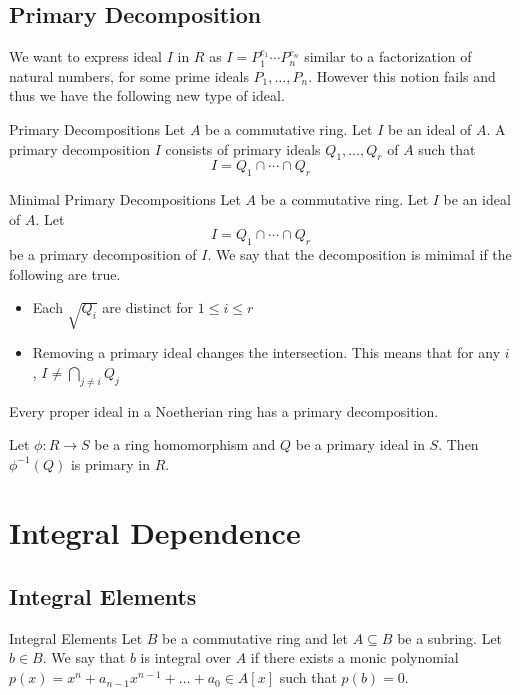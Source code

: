 \documentclass[a4paper]{article}
\begin{document}
\subsection{Primary Decomposition}
We want to express ideal $I$ in $R$ as $I=P_1^{e_1}\cdots P_n^{e_n}$ similar to a factorization of natural numbers, for some prime ideals $P_1,\dots,P_n$. However this notion fails and thus we have the following new type of ideal. 

\begin{defn}{Primary Decompositions}{} Let $A$ be a commutative ring. Let $I$ be an ideal of $A$. A primary decomposition $I$ consists of primary ideals $Q_1,\dots,Q_r$ of $A$ such that $$I=Q_1\cap\cdots\cap Q_r$$
\end{defn}

\begin{defn}{Minimal Primary Decompositions}{} Let $A$ be a commutative ring. Let $I$ be an ideal of $A$. Let $$I=Q_1\cap\cdots\cap Q_r$$ be a primary decomposition of $I$. We say that the decomposition is minimal if the following are true. 
\begin{itemize}
\item Each $\sqrt{Q_i}$ are distinct for $1\leq i\leq r$
\item Removing a primary ideal changes the intersection. This means that for any $i$, $I\neq\bigcap_{j\neq i}Q_j$
\end{itemize}
\end{defn}

\begin{thm}{}{} Every proper ideal in a Noetherian ring has a primary decomposition. 
\end{thm}

\begin{lmm}{}{} Let $\phi:R\to S$ be a ring homomorphism and $Q$ be a primary ideal in $S$. Then $\phi^{-1}(Q)$ is primary in $R$. 
\end{lmm}

\pagebreak
\section{Integral Dependence}
\subsection{Integral Elements}
\begin{defn}{Integral Elements}{} Let $B$ be a commutative ring and let $A\subseteq B$ be a subring. Let $b\in B$. We say that $b$ is integral over $A$ if there exists a monic polynomial $p(x)=x^n+a_{n-1}x^{n-1}+\dots+a_0\in A[x]$ such that $p(b)=0$. 
\end{defn}
\end{document}
